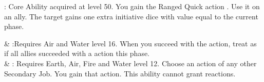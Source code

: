 \begin{ffminipage}
\noindent{}: Core Ability acquired at level 50. You gain the Ranged Quick action . Use it on an ally. The target gains one extra initiative dice with value equal to the current phase. 

\begin{jobchoice}
  & %
:Requires Air and Water level 16. When you succeed with the  action, treat as if all allies succeeded with a  action this phase. \\
    & %
: Requires Earth, Air, Fire and Water level 12. Choose an action of any other Secondary Job.  You gain that action. This ability cannot grant reactions. \\
\end{jobchoice}
\end{ffminipage}